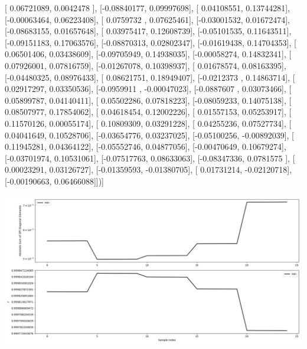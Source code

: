 \documentclass{article}
\begin{document}
       [ 0.06721089,  0.0042478 ],
       [-0.08840177,  0.09997698],
       [ 0.04108551,  0.13744281],
       [-0.00063464,  0.06223408],
       [ 0.0759732 ,  0.07625461],
       [-0.03001532,  0.01672474],
       [-0.08683155,  0.01657648],
       [ 0.03975417,  0.12608739],
       [-0.05101535,  0.11643511],
       [-0.09151183,  0.17063576],
       [-0.08870313,  0.02802347],
       [-0.01619438,  0.14704353],
       [ 0.06501406,  0.03438609],
       [-0.09705949,  0.14938035],
       [-0.00058274,  0.14832341],
       [ 0.07926001,  0.07816759],
       [-0.01267078,  0.10398937],
       [ 0.01678574,  0.08163395],
       [-0.04480325,  0.08976433],
       [ 0.08621751,  0.18949407],
       [-0.0212373 ,  0.14863714],
       [ 0.02917297,  0.03350536],
       [-0.0959911 , -0.00047023],
       [-0.0887607 ,  0.03073466],
       [ 0.05899787,  0.04140411],
       [ 0.05502286,  0.07818223],
       [-0.08059233,  0.14075138],
       [ 0.08507977,  0.17854062],
       [ 0.04618454,  0.12002226],
       [ 0.01557153,  0.05253917],
       [ 0.11570126,  0.00055174],
       [ 0.10809309,  0.03291228],
       [ 0.04255236,  0.07527734],
       [ 0.04041649,  0.10528706],
       [-0.03654776,  0.03237025],
       [-0.05100256, -0.00892039],
       [ 0.11945281,  0.04364122],
       [-0.05552746,  0.04877056],
       [-0.00470649,  0.10679274],
       [-0.03701974,  0.10531061],
       [-0.07517763,  0.08633063],
       [-0.08347336,  0.0781575 ],
       [ 0.00023291,  0.03126727],
       [-0.01359593, -0.01380705],
       [ 0.01731214, -0.02120718],
       [-0.00190663,  0.06466088]])]
\begin{center}
\includegraphics[scale=.9]{report_pickled_controls191/control_dpn_all.png}

\end{center}
\end{document}
